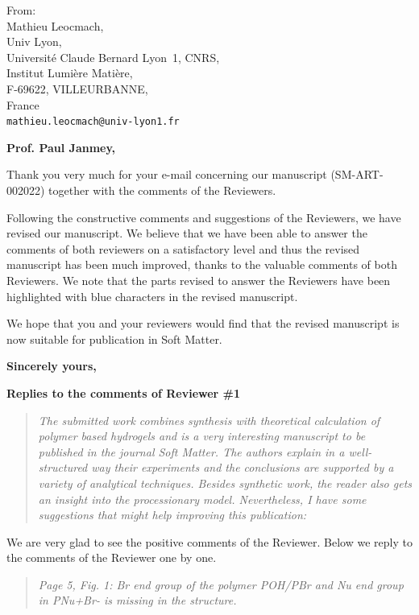 \documentclass[a4paper, parskip=true, firsthead=false, fromemail=true, foldmarks=false]{scrlttr2}
\newenvironment{quotationi}
{\begin{quotation}\itshape}
{\end{quotation}}
\newcommand{\journal}{Soft Matter}
\begin{document}
\begin{letter}{From:\\
Mathieu Leocmach,\\
Univ Lyon,\\ 
Universit\'e Claude Bernard Lyon~1, CNRS,\\
Institut Lumi\`ere Mati\`ere,\\
F-69622, VILLEURBANNE,\\
France\\
\texttt{mathieu.leocmach@univ-lyon1.fr}
}
\opening{\bf Prof. Paul Janmey,}

Thank you very much for your e-mail concerning our manuscript (SM\nobreakdash-ART-002022) together with the comments of the Reviewers. 

Following the constructive comments and suggestions of the Reviewers, we have revised our manuscript. 
We believe that we have been able to answer the comments of both reviewers on a satisfactory level and thus the revised manuscript has been much improved, thanks to the valuable comments of both Reviewers. We note that the parts revised to answer the Reviewers have been highlighted with blue characters in the revised manuscript.


We hope that you and your reviewers would find that the revised manuscript is now suitable for publication in \journal. 

\closing{\bf Sincerely yours,} 
\clearpage

\textsf{\textbf{Replies to the comments of Reviewer \#1}}

\begin{quotationi}
The submitted work combines synthesis with theoretical calculation of polymer based hydrogels and is a very interesting manuscript to be published in the journal Soft Matter. The authors explain in a well-structured way their experiments and the conclusions are supported by a variety of analytical techniques. Besides synthetic work, the reader also gets an insight into the processionary model. Nevertheless, I have some suggestions that might help improving this publication:
\end{quotationi}

We are very glad to see the positive comments of the Reviewer. Below we reply to the comments of the Reviewer one by one. 


\begin{quotationi}
Page 5, Fig. 1: Br end group of the polymer POH/PBr and Nu end group in PNu+Br- is missing in the structure.
\end{quotationi}


\end{letter}
\end{document}
